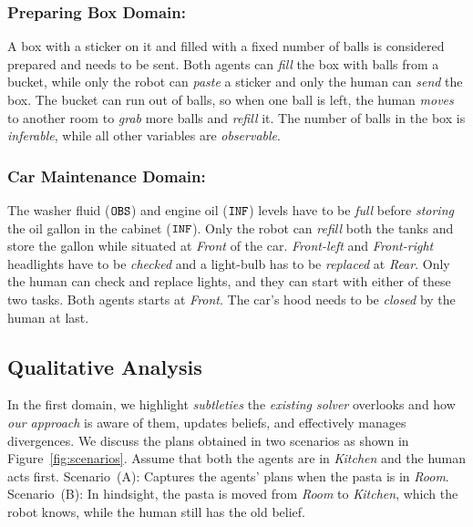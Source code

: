 \documentclass[letterpaper]{article} %
\begin{document}
\subsubsection{Preparing Box Domain:}
A box with a sticker on it and filled with a fixed number of balls is considered prepared and needs to be sent. Both agents can \textit{fill} the box with balls from a bucket, while only the robot can \textit{paste} a sticker and only the human can \textit{send} the box. The bucket can run out of balls, so when one ball is left, the human \textit{moves} to another room to \textit{grab} more balls and \textit{refill} it. 
The number of balls in the box is \textit{inferable}, while all other variables are {\em observable}. 

\subsubsection{Car Maintenance Domain:}
The washer fluid ($\texttt{OBS}$) and engine oil ($\texttt{INF}$) levels have to be \textit{full} before \textit{storing} the oil gallon in the cabinet ($\texttt{INF}$). 
Only the robot can \textit{refill} both the tanks and store the gallon while situated at \textit{Front} of the car. 
\textit{Front-left} and \textit{Front-right} headlights have to be \textit{checked} and a light-bulb has to be \textit{replaced} at \textit{Rear}. 
Only the human can check and replace lights, and they can start with either of these two tasks.
Both agents starts at \textit{Front}.
The car's hood needs to be \textit{closed} by the human at last.

\subsection{Qualitative Analysis}

In the first domain, we highlight \textit{subtleties} the \textit{existing solver} overlooks and how \textit{our approach} is aware of them, updates beliefs, and effectively manages divergences. 
We discuss the plans obtained in two scenarios 
as shown in Figure~\ref{fig:scenarios}. Assume that both the agents are in \textit{Kitchen} and the human acts first. Scenario~(A): Captures the agents' plans when the pasta is in \textit{Room}. 
Scenario~(B): 
In hindsight, the pasta is moved from \textit{Room} to {\em Kitchen}, which the robot knows, while the human still has the old belief.
\end{document}
